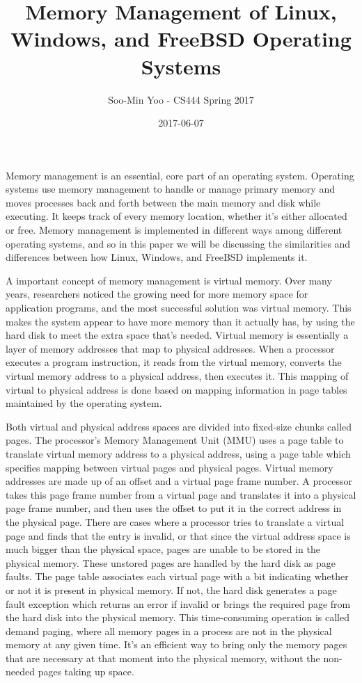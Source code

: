 \documentclass[10pt,draftclsnofoot,onecolumn,letterpaper]{IEEEtran}
\begin{document}
\title{Memory Management of Linux, Windows, and FreeBSD Operating Systems}
\author{Soo-Min Yoo - CS444 Spring 2017}
\date{2017-06-07}
\maketitle{}


Memory management is an essential, core part of an operating system. Operating systems use memory management to handle or manage primary memory and moves processes back and forth between the main memory and disk while executing. It keeps track of every memory location, whether it's either allocated or free. Memory management is implemented in different ways among different operating systems, and so in this paper we will be discussing the similarities and differences between how Linux, Windows, and FreeBSD implements it.

A important concept of memory management is virtual memory. Over many years, researchers noticed the growing need for more memory space for application programs, and the most successful solution was virtual memory. This makes the system appear to have more memory than it actually has, by using the hard disk to meet the extra space that's needed. Virtual memory is essentially a layer of memory addresses that map to physical addresses\cite{3}. When a processor executes a program instruction, it reads from the virtual memory, converts the virtual memory address to a physical address, then executes it. This mapping of virtual to physical address is done based on mapping information in page tables maintained by the operating system\cite{1}.

Both virtual and physical address spaces are divided into fixed-size chunks called pages. The processor's Memory Management Unit (MMU) uses a page table to translate virtual memory address to a physical address, using a page table which specifies mapping between virtual pages and physical pages\cite{1}. Virtual memory addresses are made up of an offset and a virtual page frame number. A processor takes this page frame number from a virtual page and translates it into a physical page frame number, and then uses the offset to put it in the correct address in the physical page\cite{2}.
There are cases where a processor tries to translate a virtual page and finds that the entry is invalid, or that since the virtual address space is much bigger than the physical space, pages are unable to be stored in the physical memory. These unstored pages are handled by the hard disk as page faults\cite{2}. The page table associates each virtual page with a bit indicating whether or not it is present in physical memory. If not, the hard disk generates a page fault exception which returns an error if invalid or brings the required page from the hard disk into the physical memory. This time-consuming operation is called demand paging, where all memory pages in a process are not in the physical memory at any given time\cite{3}. It's an efficient way to bring only the memory pages that are necessary at that moment into the physical memory, without the non-needed pages taking up space.
\end{document}

